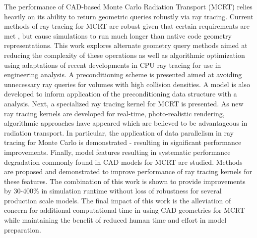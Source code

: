 


The performance of CAD-based Monte Carlo Radiation Transport (MCRT) relies
heavily on its ability to return geometric queries robustly via ray
tracing. Current methods of ray tracing for MCRT are robust given that certain
requirements are met \cite{Smith_2011}, but cause simulations to run much longer
than native code geometry representations. This work explores alternate geometry
query methods aimed at reducing the complexity of these operations as well as
algorithmic optimization using adaptations of recent developments in CPU ray
tracing for use in engineering analysis. A preconditioning scheme is presented
aimed at avoiding unnecessary ray queries for volumes with high collision
densities. A model is also developed to inform application of the
preconditioning data structure with a  analysis. Next, a
specialized ray tracing kernel for MCRT is presented. As new ray tracing kernels
are developed for real-time, photo-realistic rendering, algorithmic approaches
have appeared which are believed to be advantageous in radiation transport. In
particular, the application of data parallelism in ray tracing for Monte Carlo is
demonstrated - resulting in significant performance improvements. Finally, model
features resulting in systematic performance degradation commonly found in CAD
models for MCRT are studied. Methods are proposed and demonstrated to improve
performance of ray tracing kernels for these features. The combination of this
work is shown to provide improvements by 30-400\% in simulation runtime without
loss of robustness for several production scale models. The final impact of this
work is the alleviation of concern for additional computational time in using
CAD geometries for MCRT while maintaining the benefit of reduced human time and
effort in model preparation.
